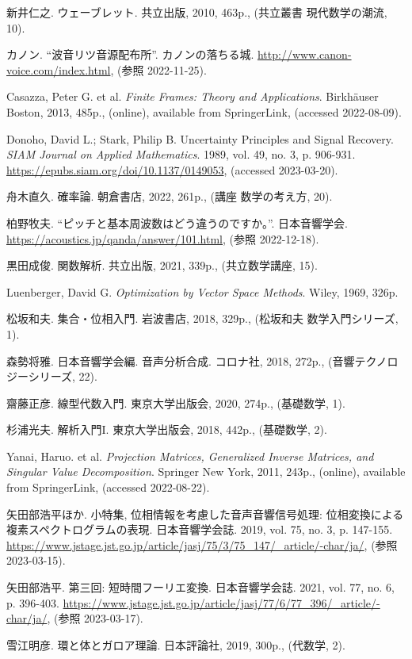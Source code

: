 \documentclass[../../main]{subfiles}
\begin{document}
{}
\begin{thebibliography}{99}
    新井仁之. ウェーブレット. 共立出版, 2010, 463p., (共立叢書 現代数学の潮流, 10).

    カノン. “波音リツ音源配布所”. カノンの落ちる城. \url{http://www.canon-voice.com/index.html}, (参照 2022-11-25).

    Casazza, Peter G. et al. \textit{Finite Frames: Theory and Applications}. Birkhäuser Boston, 2013, 485p., (online), available from SpringerLink, (accessed 2022-08-09).

    Donoho, David L.; Stark, Philip B. Uncertainty Principles and Signal Recovery. \textit{SIAM Journal on Applied Mathematics}. 1989, vol. 49, no. 3, p. 906-931. \url{https://epubs.siam.org/doi/10.1137/0149053}, (accessed 2023-03-20).

    舟木直久. 確率論. 朝倉書店, 2022, 261p., (講座 数学の考え方, 20).

    柏野牧夫. “ピッチと基本周波数はどう違うのですか。”. 日本音響学会. \url{https://acoustics.jp/qanda/answer/101.html}, (参照 2022-12-18).

    黒田成俊. 関数解析. 共立出版, 2021, 339p., (共立数学講座, 15).

    Luenberger, David G. \textit{Optimization by Vector Space Methods}. Wiley, 1969, 326p.

    松坂和夫. 集合・位相入門. 岩波書店, 2018, 329p., (松坂和夫 数学入門シリーズ, 1).

    森勢将雅. 日本音響学会編. 音声分析合成. コロナ社, 2018, 272p., (音響テクノロジーシリーズ, 22).

    齋藤正彦. 線型代数入門. 東京大学出版会, 2020, 274p., (基礎数学, 1).

    杉浦光夫. 解析入門I. 東京大学出版会, 2018, 442p., (基礎数学, 2).

    Yanai, Haruo. et al. \textit{Projection Matrices, Generalized Inverse Matrices, and Singular Value Decomposition}. Springer New York, 2011, 243p., (online), available from SpringerLink, (accessed 2022-08-22).

    矢田部浩平ほか. 小特集, 位相情報を考慮した音声音響信号処理: 位相変換による複素スペクトログラムの表現. 日本音響学会誌. 2019, vol. 75, no. 3, p. 147-155. \url{https://www.jstage.jst.go.jp/article/jasj/75/3/75_147/_article/-char/ja/}, (参照 2023-03-15).

    矢田部浩平. 第三回: 短時間フーリエ変換. 日本音響学会誌. 2021, vol. 77, no. 6, p. 396-403. \url{https://www.jstage.jst.go.jp/article/jasj/77/6/77_396/_article/-char/ja/}, (参照 2023-03-17).

    雪江明彦. 環と体とガロア理論. 日本評論社, 2019, 300p., (代数学, 2).
\end{thebibliography}
\end{document}
